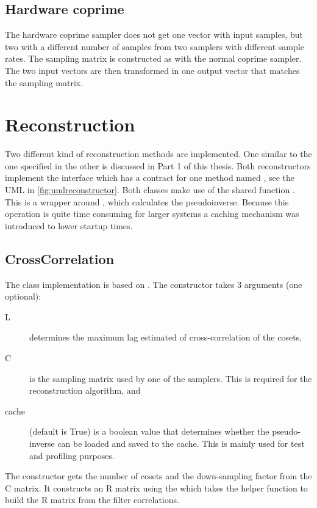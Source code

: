 \documentclass[a4paper, openany, oneside]{memoir}
\begin{document}
\subsection{Hardware coprime}
\label{sec:hardware-coprime}
The hardware coprime sampler does not get one vector with input samples, but two with a different number of samples from two samplers with different sample rates. The sampling matrix is constructed as with the normal coprime sampler. The two input vectors are then transformed in one output vector that matches the sampling matrix.

\section{Reconstruction}
\label{sec:reconstruction}
Two different kind of reconstruction methods are implemented. One similar to the one specified in \cite{ariananda2012compressive} the other is discussed in Part 1 of this thesis. Both reconstructors implement the interface  which has a contract for one method named , see the UML in \cref{fig:umlreconstructor}. Both classes make use of the shared function . This is a wrapper around  , which calculates the pseudoinverse. Because this operation is quite time consuming for larger systems a caching mechanism was introduced to lower startup times.%

\subsection{CrossCorrelation}
\label{sub:crosscorrelation}
The  class implementation is based on \cite{ariananda2012compressive}. The constructor takes 3 arguments (one optional):
\begin{description}
    \item[L] determines the maximum lag estimated of cross-correlation of the cosets,
    \item[C] is the sampling matrix used by one of the samplers. This is required for the reconstruction algorithm, and
    \item[cache] (default is True) is a boolean value that determines whether the pseudo-inverse can be loaded and saved to the cache. This is mainly used for test and profiling purposes.
\end{description}
The constructor gets the number of cosets and the down-sampling factor from the C matrix. It constructs an R matrix using the  which takes the  helper function to build the R matrix from the filter correlations.
\end{document}

